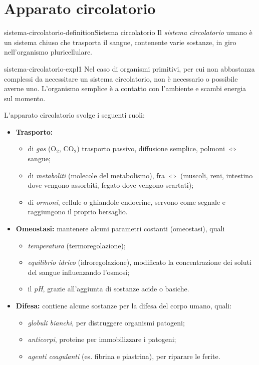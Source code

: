 \documentclass[preview]{standalone}
\begin{document}
\genpage

\section{Apparato circolatorio}

\begin{snippetdefinition}{sistema-circolatorio-definition}{Sistema circolatorio}
    Il \textit{sistema circolatorio} umano è un sistema chiuso
    che trasporta il sangue, contenente varie sostanze, in giro nell'organismo pluricellulare.
\end{snippetdefinition}

\begin{snippet}{sistema-circolatorio-expl1}
    Nel caso di organismi primitivi, per cui non abbastanza complessi da necessitare un sistema circolatorio,
    non è necessario o possibile averne uno.
    L'organismo semplice è a contatto con l'ambiente e scambi energia sul momento.

    L'apparato circolatorio svolge i seguenti ruoli:
    \begin{itemize}
        \item \textbf{Trasporto:} 
        \begin{itemize}
            \item di \textit{gas} (O\({}_2\), CO\({}_2\)) trasporto passivo, diffusione semplice, polmoni \(\iff\) sangue;
            \item di \textit{metaboliti} (molecole del metabolismo), fra \(\iff\) (muscoli, reni, intestino dove vengono assorbiti, fegato dove vengono scartati);
            \item di \textit{ormoni}, cellule o ghiandole endocrine, servono come segnale e raggiungono il proprio bersaglio. %
        \end{itemize}
        \item \textbf{Omeostasi:} mantenere alcuni parametri costanti (omeostasi), quali
            \begin{itemize}
                \item \textit{temperatura} (termoregolazione);
                \item \textit{equilibrio idrico} (idroregolazione), modificato la concentrazione dei soluti del sangue influenzando l'osmosi;
                \item il \textit{pH}, grazie all'aggiunta di sostanze acide o basiche.
            \end{itemize}
        \item \textbf{Difesa:} contiene alcune sostanze per la difesa del corpo umano, quali:
            \begin{itemize}
                \item \textit{globuli bianchi}, per distruggere organismi patogeni;
                \item \textit{anticorpi}, proteine per immobilizzare i patogeni;
                \item \textit{agenti coagulanti} (es. fibrina e piastrina), per riparare le ferite.
            \end{itemize}
    \end{itemize}


\end{snippet}
\end{document}
